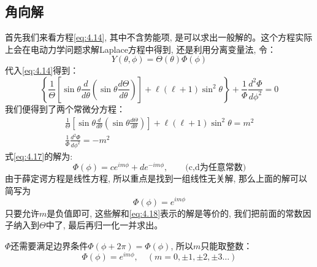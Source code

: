 \documentclass[a4paper,zihao=-4,linespread=1]{ctexrep}
\begin{document}
    \subsection*{角向解}
    首先我们来看方程\ref{eq:4.14}, 其中不含势能项, 是可以求出一般解的。这个方程实际上会在电动力学问题求解Laplace方程中得到, 还是利用分离变量法, 令：
    \[Y(\theta,\phi)=\Theta(\theta)\Phi(\phi)\]
    代入\ref{eq:4.14}得到：
    \begin{equation}
        \left\{\frac{1}{\Theta}\left[\sin \theta \frac{d}{d \theta}\left(\sin \theta \frac{d \Theta}{d \theta}\right)\right]+\ell(\ell+1) \sin ^{2} \theta\right\}+\frac{1}{\Phi} \frac{d^{2} \Phi}{d \phi^{2}}=0
    \end{equation}
    我们便得到了两个常微分方程：
    \begin{gather}
        \frac{1}{\Theta}\left[\sin \theta \frac{d}{d \theta}\left(\sin \theta \frac{d \Theta}{d \theta}\right)\right]+\ell(\ell+1) \sin ^{2} \theta=m^2\label{eq:4.16}\\
        \frac{1}{\Phi} \frac{d^{2} \Phi}{d \phi^{2}}=-m^2\label{eq:4.17}
    \end{gather}
    式\ref{eq:4.17}的解为:
    \begin{equation}
        \label{eq:4.18}
        \Phi(\phi)=ce^{im\phi}+de^{-im\phi},\qquad\text{(c,d为任意常数)}
    \end{equation}
    由于薛定谔方程是线性方程, 所以重点是找到一组线性无关解, 那么上面的解可以简写为
    \[\Phi(\phi)=e^{im\phi}\]
    只要允许$m$是负值即可, 这些解和\ref{eq:4.18}表示的解是等价的, 我们把前面的常数因子纳入到$\Theta$中了, 最后再归一化一并求出。
    
    $\Phi$还需要满足边界条件$\Phi(\phi+2\pi)=\Phi(\phi)$, 所以$m$只能取整数：
    \begin{equation}
        \boxed{\Phi(\phi)=e^{im\phi}, \quad(m=0,\pm 1,\pm 2,\pm 3\ldots)}
    \end{equation}
\end{document}
